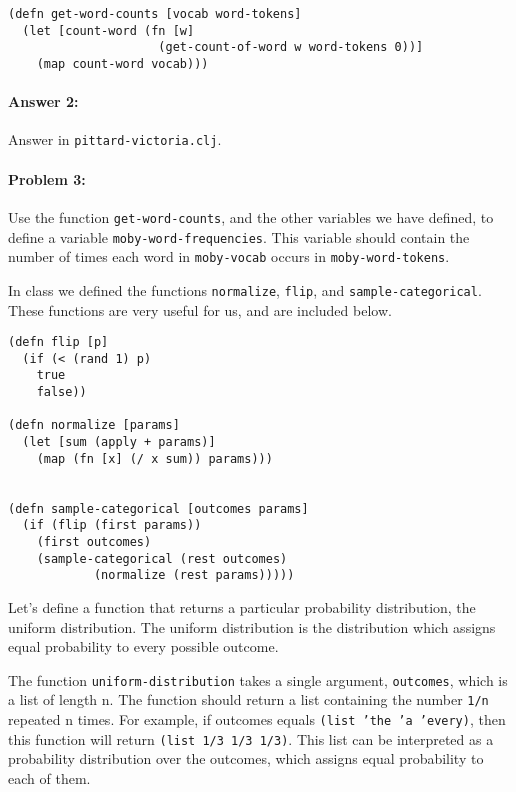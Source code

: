 \documentclass[10pt]{article}
\begin{document}
\begin{lstlisting}
(defn get-word-counts [vocab word-tokens]
  (let [count-word (fn [w] 
                     (get-count-of-word w word-tokens 0))]
    (map count-word vocab)))
\end{lstlisting}

\paragraph{Answer 2:} Answer in
\texttt{pittard-victoria.clj}.

\hrulefill
\paragraph{Problem 3:}

Use the function \texttt{get-word-counts}, and the other variables we have
defined, to define a variable \texttt{moby-word-frequencies}. This variable
should contain the number of times each word in \texttt{moby-vocab} occurs in
\texttt{moby-word-tokens}.

In class we defined the functions \texttt{normalize}, \texttt{flip},
and \texttt{sample-categorical}. These functions are very useful for
us, and are included below.

\begin{lstlisting}
(defn flip [p]
  (if (< (rand 1) p)
    true
    false))

(defn normalize [params]
  (let [sum (apply + params)]
    (map (fn [x] (/ x sum)) params)))


(defn sample-categorical [outcomes params]
  (if (flip (first params))
    (first outcomes)
    (sample-categorical (rest outcomes) 
			(normalize (rest params)))))
\end{lstlisting}

Let's define a function that returns a particular probability
distribution, the uniform distribution. The uniform distribution is
the distribution which assigns equal probability to every possible
outcome.
  
The function \texttt{uniform-distribution} takes a single argument,
\texttt{outcomes}, which is a list of length n. The function should
return a list containing the number \texttt{1/n} repeated n times. For
example, if outcomes equals \texttt{(list 'the 'a 'every)}, then this
function will return \texttt{(list 1/3 1/3 1/3)}. This list can be
interpreted as a probability distribution over the outcomes, which
assigns equal probability to each of them.
\end{document}
